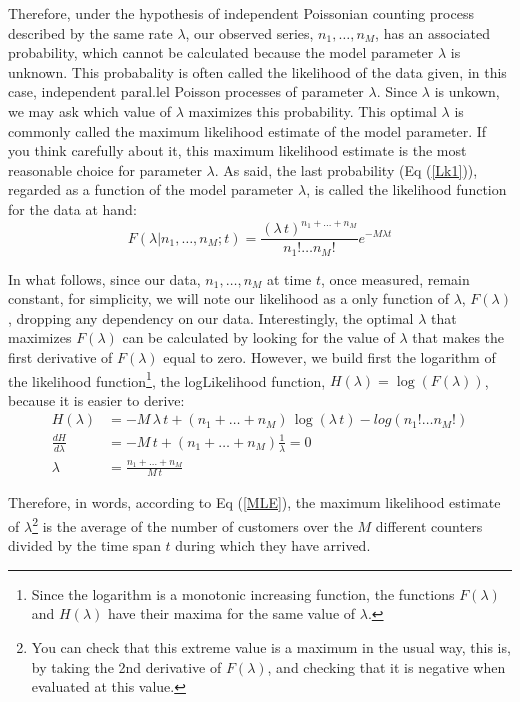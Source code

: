 \documentclass{article}
\begin{document}
Therefore, under the hypothesis of independent Poissonian counting process described by the same rate $\lambda$, our observed series, $n_1, \dots, n_M$, has an associated probability, which cannot be calculated because the model parameter $\lambda$ is unknown. This probabality is often called the likelihood of the data given, in this case, independent paral.lel Poisson processes of parameter $\lambda$. Since $\lambda$ is unkown, we may ask which value of $\lambda$ maximizes this probability. This optimal $\lambda$ is commonly called the maximum likelihood estimate of the model parameter. If you think carefully about it, this maximum likelihood estimate is the most reasonable choice for parameter $\lambda$. As said, the last probability (Eq (\ref{Lk1})), regarded as a function of the model parameter $\lambda$, is called the likelihood function for the data at hand:
\begin{equation}
F(\lambda |n_1, \dots, n_M;  t) =  \frac{(\lambda\,t)^{n_1+\dots+n_M}}{n_1!\dots n_M!}e^{-M \lambda t}
\label{Lk2}
\end{equation}

In what follows, since our data, $n_1, \dots, n_M$ at time $t$, once measured, remain constant, for simplicity, we will note our likelihood as a only function of $\lambda$, $F(\lambda)$, dropping any dependency on our data. Interestingly, the optimal $\lambda$ that maximizes $F(\lambda)$ can be calculated by looking for the value of $\lambda$ that makes the first derivative of $F(\lambda)$ equal to zero. However, we build first the logarithm of the likelihood function\footnote{Since the logarithm is a monotonic increasing function, the functions $F(\lambda)$ and  $H(\lambda)$ have their maxima for the same value of $\lambda$.}, the logLikelihood function, $H(\lambda) = \log(F(\lambda))$, because it is easier to derive:
\begin{align}
H(\lambda) &= -M\,\lambda\,t + (n_1+\dots+n_M)\,\log(\lambda\,t) - log(n_1!\dots n_M!)\nonumber\\
\frac{dH}{d\lambda} &= -M\,t + (n_1+\dots+n_M)\frac{1}{\lambda} = 0                      \nonumber\\
\lambda &= \frac{n_1+\dots+n_M}{M\,t} \label{MLE}
\end{align}

Therefore, in words, according to Eq (\ref{MLE}), the maximum likelihood estimate of $\lambda$\footnote{You can check that this extreme value is a maximum in the usual way, this is, by taking the 2nd derivative of $F(\lambda)$, and checking that it is negative when evaluated at this value.} is the average of the number of customers over the $M$ different counters divided by the time span $t$ during which they have arrived.
\end{document}
